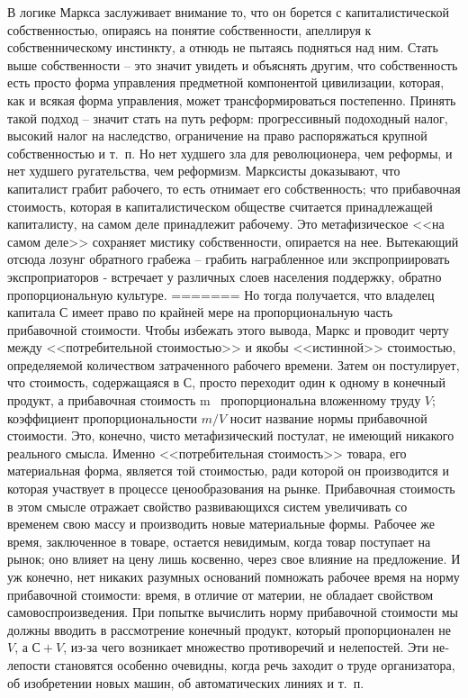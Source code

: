 \documentclass{book}
\begin{document}
В логике Маркса заслуживает внимание то, что он борется с капиталистической собственностью, опираясь на понятие соб­ственности, апеллируя к собственническому инстинкту, а отнюдь не пытаясь подняться над ним. Стать выше собственности -- это значит увидеть и объяснять другим, что собственность есть просто форма управления предметной компонентой цивилиза­ции, которая, как и всякая форма управления, может транс­формироваться постепенно. Принять такой подход -- значит стать на путь реформ: прогрессивный подоходный налог, высо­кий налог на наследство, ограничение на право распоряжаться крупной собственностью и т.~п. Но нет худшего зла для рево­люционера, чем реформы, и нет худшего ругательства, чем ре­формизм. Марксисты доказывают, что капиталист грабит  рабо­чего, то есть отнимает его собственность;  что прибавочная сто­имость, которая в капиталистическом обществе считается при­надлежащей капиталисту, на самом деле  принадлежит рабочему. Это метафизическое <<на самом деле>> сохраняет мистику собст­венности, опирается на нее. Вытекающий отсюда лозунг обрат­ного грабежа -- грабить награбленное или экспроприировать экспроприаторов ‑ встречает у различных слоев населения поддержку, обратно пропорциональную культуре.
=======
Но тогда получается, что владелец капитала С имеет право по крайней мере на пропорциональную часть прибавочной стои­мости. Чтобы избежать этого вывода, Маркс и проводит черту между <<потребительной стоимостью>> и якобы <<истинной>> стоимостью, определяемой количеством затраченного рабочего времени. Затем он постулирует, что стоимость, содержащаяся в $С$, просто переходит один к одному в конечный продукт, а прибавочная стоимость m  пропорциональна вложенному труду $V$; коэффициент пропорциональности $m/V$ носит назва­ние нормы прибавочной стоимости. Это, конечно, чисто мета­физический постулат, не имеющий никакого реального смысла. Именно <<потребительная стоимость>> товара, его материальная форма, является той стоимостью, ради которой он производит­ся и которая участвует в процессе ценообразования на рынке. Прибавочная стоимость в этом смысле отражает свойство раз­вивающихся систем увеличивать со временем свою массу и про­изводить новые материальные формы. Рабочее же время, заклю­ченное в товаре, остается 
невидимым, когда товар поступает на рынок; оно влияет на цену лишь косвенно, через свое влия­ние на предложение. И уж конечно, нет никаких разумных ос­нований помножать рабочее время на норму прибавочной сто­имости: время, в отличие от материи, не обладает свойством самовоспроизведения. При попытке вычислить норму приба­вочной стоимости мы должны вводить в рассмотрение конечный продукт, который пропорционален не $V$, а $С + V$, из-за чего возникает множество противоречий и нелепостей. Эти не­лепости становятся особенно очевидны, когда речь заходит о труде организатора, об изобретении новых машин, об автоматических линиях и т.~п.
\end{document}
